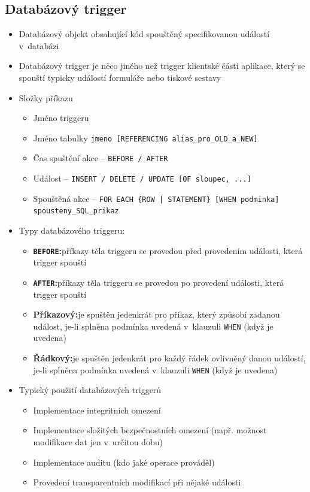 \documentclass[a4paper,10pt]{article}
\newcommand{\pojem}[2]{\item \textbf{#1:}\quad #2}
\begin{document}
		\subsection{Databázový trigger}
			\begin{itemize}
				\item Databázový objekt obsahující kód spouštěný specifikovanou událostí v~databázi
				\item Databázový trigger je něco jiného než trigger klientské části aplikace, který se spouští typicky událostí formuláře nebo tiskové sestavy
				\item Složky příkazu
				\begin{itemize}
					\item Jméno triggeru
					\item Jméno tabulky \texttt{jmeno [REFERENCING alias\_pro\_OLD\_a\_NEW]}
					\item Čas spuštění akce -- \texttt{BEFORE / AFTER}
					\item Událost -- \texttt{INSERT / DELETE / UPDATE [OF sloupec, ...]}
					\item Spouštěná akce -- \texttt{FOR EACH \{ROW | STATEMENT\} [WHEN podminka] spousteny\_SQL\_prikaz}
				\end{itemize}
				\item Typy databázového triggeru:
				\begin{itemize}
					\pojem{\texttt{BEFORE}}{příkazy těla triggeru se provedou před provedením události, která trigger spouští}
					\pojem{\texttt{AFTER}}{příkazy těla triggeru se provedou po provedení události, která trigger spouští}
					\pojem{Příkazový}{je spuštěn jedenkrát pro příkaz, který způsobí zadanou událost, je-li splněna podmínka uvedená v~klauzuli \texttt{WHEN} (když je uvedena)}
					\pojem{Řádkový}{je spuštěn jedenkrát pro každý řádek ovlivněný danou událostí, je-li splněna podmínka uvedená v~klauzuli \texttt{WHEN} (když je uvedena)}
				\end{itemize}
				\item Typický použití databázových triggerů
				\begin{itemize}
					\item Implementace integritních omezení
					\item Implementace složitých bezpečnostních omezení (např. možnost modifikace dat jen v~určitou dobu)
					\item Implementace auditu (kdo jaké operace prováděl)
					\item Provedení transparentních modifikací při nějaké události

\end{itemize}
\end{itemize}
\end{document}
